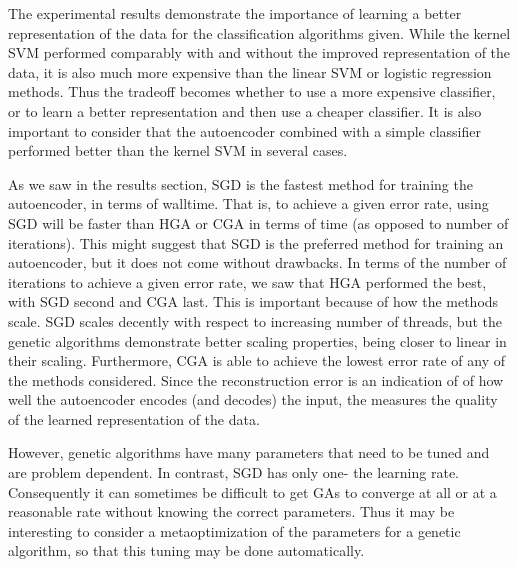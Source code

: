 The experimental results demonstrate the importance of learning a better representation of the data for the classification algorithms given. While the kernel SVM performed comparably with and without the improved representation of the data, it is also much more expensive than the linear SVM or logistic regression methods. Thus the tradeoff becomes whether to use a more expensive classifier, or to learn a better representation and then use a cheaper classifier. It is also important to consider that the autoencoder combined with a simple classifier performed better than the kernel SVM in several cases.

As we saw in the results section, SGD is the fastest method for training the autoencoder, in terms of walltime. That is, to achieve a given error rate, using SGD will be faster than HGA or CGA in terms of time (as opposed to number of iterations). This might suggest that SGD is the preferred method for training an autoencoder, but it does not come without drawbacks. In terms of the number of iterations to achieve a given error rate, we saw that HGA performed the best, with SGD second and CGA last. This is important because of how the methods scale. SGD scales decently with respect to increasing number of threads, but the genetic algorithms demonstrate better scaling properties, being closer to linear in their scaling. 
Furthermore, CGA is able to achieve the lowest error rate of any of the methods considered. Since the reconstruction error is an indication of of how well the autoencoder encodes (and decodes) the input, the measures the quality of the learned representation of the data.

However, genetic algorithms have many parameters that need to be tuned and are problem dependent. In contrast, SGD has only one- the learning rate. Consequently it can sometimes be difficult to get GAs to converge at all or at a reasonable rate without knowing the correct parameters. Thus it may be interesting to consider a metaoptimization of the parameters for a genetic algorithm, so that this tuning may be done automatically. 

